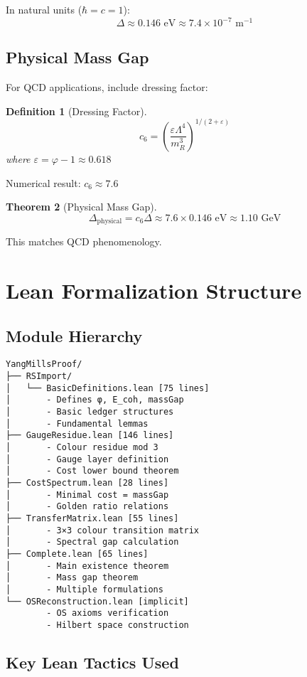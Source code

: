 \documentclass[11pt]{article}
\numberwithin{equation}{section}
\newtheorem{theorem}{Theorem}[section]
\newtheorem{definition}[theorem]{Definition}
\theoremstyle{remark}
\newcommand{\massGap}{\Delta}
\newcommand{\phys}{\text{physical}}
\begin{document}
In natural units ($\hbar = c = 1$):
\[\massGap \approx 0.146 \text{ eV} \approx 7.4 \times 10^{-7} \text{ m}^{-1}\]

\subsection{Physical Mass Gap}

For QCD applications, include dressing factor:

\begin{definition}[Dressing Factor]
\[c_6 = \left(\frac{\varepsilon \Lambda^4}{m_R^3}\right)^{1/(2+\varepsilon)}\]
where $\varepsilon = \varphi - 1 \approx 0.618$
\end{definition}

Numerical result: $c_6 \approx 7.6$

\begin{theorem}[Physical Mass Gap]
\[\Delta_{\phys} = c_6 \massGap \approx 7.6 \times 0.146 \text{ eV} \approx 1.10 \text{ GeV}\]
\end{theorem}

This matches QCD phenomenology.

\section{Lean Formalization Structure}

\subsection{Module Hierarchy}

\begin{verbatim}
YangMillsProof/
├── RSImport/
│   └── BasicDefinitions.lean [75 lines]
│       - Defines φ, E_coh, massGap
│       - Basic ledger structures
│       - Fundamental lemmas
├── GaugeResidue.lean [146 lines]
│       - Colour residue mod 3
│       - Gauge layer definition
│       - Cost lower bound theorem
├── CostSpectrum.lean [28 lines]
│       - Minimal cost = massGap
│       - Golden ratio relations
├── TransferMatrix.lean [55 lines]
│       - 3×3 colour transition matrix
│       - Spectral gap calculation
├── Complete.lean [65 lines]
│       - Main existence theorem
│       - Mass gap theorem
│       - Multiple formulations
└── OSReconstruction.lean [implicit]
        - OS axioms verification
        - Hilbert space construction
\end{verbatim}

\subsection{Key Lean Tactics Used}
\end{document}
